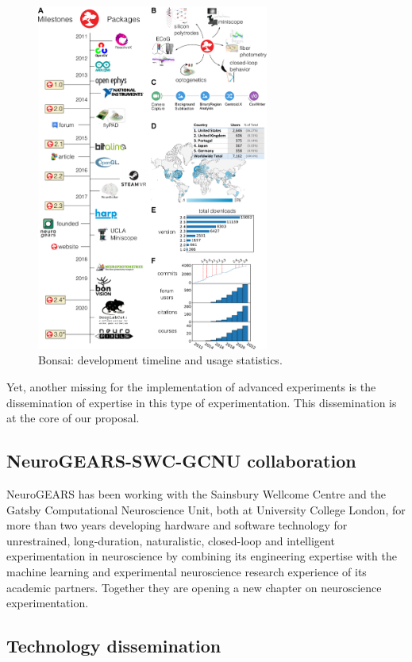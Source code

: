 \begin{figure}
	\begin{center}
		\includegraphics[width=3in]{figures/roadmap-bbsrc-3x.pdf}
	\end{center}
	\caption{Bonsai: development timeline and usage statistics.}
	\label{fig:bonsai}
\end{figure}

Yet, another missing for the implementation of advanced experiments is the
dissemination of expertise in this type of experimentation. This dissemination
is at the core of our proposal.

\subsection{NeuroGEARS-SWC-GCNU collaboration}

NeuroGEARS has been working with the Sainsbury Wellcome Centre and the Gatsby
Computational Neuroscience Unit, both at University College London, for more
than two years developing hardware and software technology for unrestrained,
long-duration, naturalistic, closed-loop and intelligent experimentation in
neuroscience by combining its engineering expertise with the machine learning
and experimental neuroscience research experience of its academic partners.
Together they are opening a new chapter on neuroscience experimentation.

\subsection{Technology dissemination}

